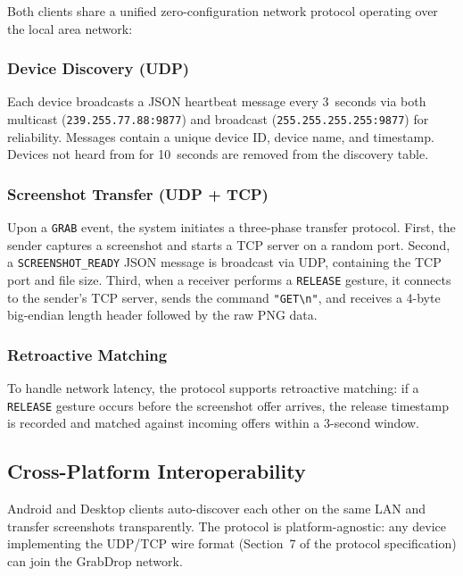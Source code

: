 Both clients share a unified zero-configuration network protocol
operating over the local area network:

\subsubsection{Device Discovery (UDP)}

Each device broadcasts a JSON heartbeat message every 3~seconds via
both multicast (\texttt{239.255.77.88:9877}) and broadcast
(\texttt{255.255.255.255:9877}) for reliability. Messages contain a
unique device ID, device name, and timestamp. Devices not heard from
for 10~seconds are removed from the discovery table.

\subsubsection{Screenshot Transfer (UDP + TCP)}

Upon a \texttt{GRAB} event, the system initiates a three-phase transfer protocol. First, the sender captures a screenshot and starts a TCP server on a random port. Second, a \texttt{SCREENSHOT\_READY} JSON message is broadcast via UDP, containing the TCP port and file size. Third, when a receiver performs a \texttt{RELEASE} gesture, it connects to the sender's TCP server, sends the command \texttt{"GET\textbackslash n"}, and receives a 4-byte big-endian length header followed by the raw PNG data.

\subsubsection{Retroactive Matching}

To handle network latency, the protocol supports retroactive matching:
if a \texttt{RELEASE} gesture occurs before the screenshot offer
arrives, the release timestamp is recorded and matched against
incoming offers within a 3-second window.

\subsection{Cross-Platform Interoperability}

Android and Desktop clients auto-discover each other on the same LAN
and transfer screenshots transparently. The protocol is
platform-agnostic: any device implementing the UDP/TCP wire format
(Section~7 of the protocol specification) can join the GrabDrop
network.
